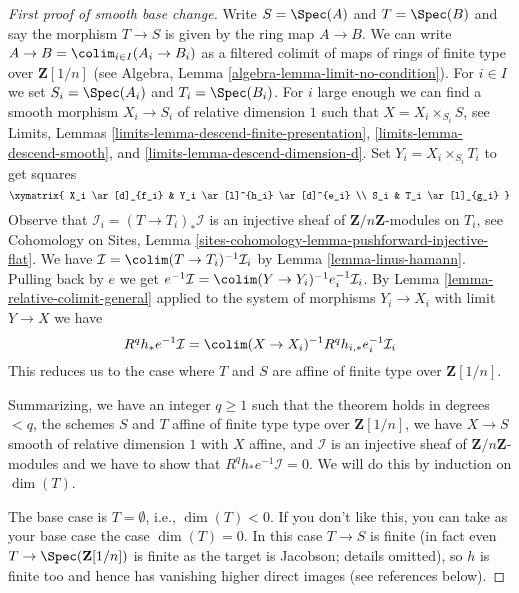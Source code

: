 \begin{proof}[First proof of smooth base change]
\medskip\noindent
Write $S = \Spec(A)$ and $T = \Spec(B)$ and say the morphism
$T \to S$ is given by the ring map $A \to B$. We can write
$A \to B = \colim_{i \in I} (A_i \to B_i)$ as a filtered
colimit of maps of rings of finite type over $\mathbf{Z}[1/n]$
(see Algebra, Lemma \ref{algebra-lemma-limit-no-condition}).
For $i \in I$ we set $S_i = \Spec(A_i)$ and $T_i = \Spec(B_i)$.
For $i$ large enough we can find a smooth morphism $X_i \to S_i$
of relative dimension $1$ such that $X = X_i \times_{S_i} S$, see
Limits, Lemmas \ref{limits-lemma-descend-finite-presentation},
\ref{limits-lemma-descend-smooth}, and
\ref{limits-lemma-descend-dimension-d}. Set $Y_i = X_i \times_{S_i} T_i$
to get squares
$$
\xymatrix{
X_i \ar[d]_{f_i} & Y_i \ar[l]^{h_i} \ar[d]^{e_i} \\
S_i & T_i \ar[l]_{g_i}
}
$$
Observe that $\mathcal{I}_i = (T \to T_i)_*\mathcal{I}$
is an injective sheaf of $\mathbf{Z}/n\mathbf{Z}$-modules on
$T_i$, see Cohomology on Sites, Lemma
\ref{sites-cohomology-lemma-pushforward-injective-flat}.
We have $\mathcal{I} = \colim (T \to T_i)^{-1}\mathcal{I}_i$
by Lemma \ref{lemma-linus-hamann}. Pulling back by $e$ we get
$e^{-1}\mathcal{I} = \colim (Y \to Y_i)^{-1}e_i^{-1}\mathcal{I}_i$.
By Lemma \ref{lemma-relative-colimit-general} applied to the system
of morphisms $Y_i \to X_i$ with limit $Y \to X$ we have
$$
R^qh_*e^{-1}\mathcal{I} =
\colim (X \to X_i)^{-1} R^qh_{i, *} e_i^{-1}\mathcal{I}_i
$$
This reduces us to the case where $T$ and $S$ are affine of finite
type over $\mathbf{Z}[1/n]$.

\medskip\noindent
Summarizing, we have an integer $q \geq 1$ such that the theorem holds
in degrees $< q$, the schemes $S$ and $T$ affine of finite type
type over $\mathbf{Z}[1/n]$, we have
$X \to S$ smooth of relative dimension $1$ with $X$ affine, and
$\mathcal{I}$ is an injective sheaf of $\mathbf{Z}/n\mathbf{Z}$-modules
and we have to show that $R^qh_*e^{-1}\mathcal{I} = 0$.
We will do this by induction on $\dim(T)$.

\medskip\noindent
The base case is $T = \emptyset$, i.e., $\dim(T) < 0$.
If you don't like this, you can take as your base case
the case $\dim(T) = 0$. In this case $T \to S$ is finite
(in fact even $T \to \Spec(\mathbf{Z}[1/n])$ is finite as the
target is Jacobson; details omitted), so
$h$ is finite too and hence has
vanishing higher direct images (see references below).


\end{proof}
